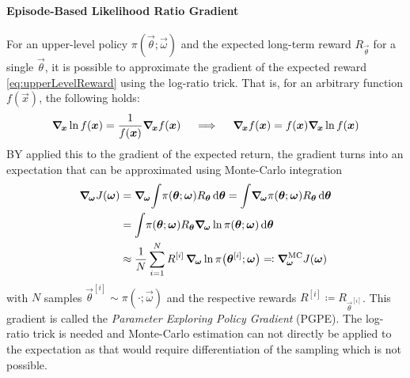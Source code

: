 				\paragraph{Episode-Based Likelihood Ratio Gradient}
					For an upper-level policy \( \pi(\vec{\theta}; \vec{\omega}) \) and the expected long-term reward \( R_{\vec{\theta}} \) for a single \(\vec{\theta}\), it is possible to approximate the gradient of the expected reward \eqref{eq:upperLevelReward} using the log-ratio trick. That is, for an arbitrary function \( f(\vec{x}) \), the following holds:
					\begin{equation*}
						\grad_{\!\bm{x}} \ln f(\bm{x}) = \frac{1}{f(\bm{x})} \grad_{\!\bm{x}} f(\bm{x}) \quad\implies\quad \grad_{\!\bm{x}} f(\bm{x}) = f(\bm{x}) \grad_{\!\bm{x}} \ln f(\bm{x})
					\end{equation*}
					BY applied this to the gradient of the expected return, the gradient turns into an expectation that can be approximated using Monte-Carlo integration
					\begin{align}
						\grad_{\!\vec{\omega}} J(\vec{\omega})
							&= \grad_{\!\vec{\omega}} \!\int\! \pi(\vec{\theta}; \vec{\omega}) R_{\vec{\theta}} \dd{\vec{\theta}}
							 = \int\! \grad_{\!\vec{\omega}} \pi(\vec{\theta}; \vec{\omega}) R_{\vec{\theta}} \dd{\vec{\theta}}  \nonumber \\
							&= \int\! \pi(\vec{\theta}; \vec{\omega}) R_{\vec{\theta}} \grad_{\!\vec{\omega}} \ln \pi(\vec{\theta}; \vec{\omega}) \dd{\vec{\theta}}  \nonumber \\
							&\approx \frac{1}{N} \sum_{i = 1}^{N} R^{[i]} \, \grad_{\!\vec{\omega}} \ln \pi\big(\vec{\theta}^{[i]}; \vec{\omega}\big) \eqqcolon \grad_{\!\vec{\omega}}^\mathrm{MC} J(\vec{\omega})  \label{eq:episodicPolicyGradientGradient}
					\end{align}
					with \(N\) samples \( \vec{\theta}^{[i]} \sim \pi(\cdot; \vec{\omega}) \) and the respective rewards \( R^{[i]} \coloneqq R_{\vec{\theta}^{[i]}} \). This gradient is called the \emph{Parameter Exploring Policy Gradient} (PGPE). The log-ratio trick is needed and Monte-Carlo estimation can not directly be applied to the expectation as that would require differentiation of the sampling which is not possible.

